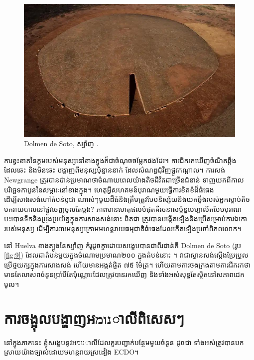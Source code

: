 \documentclass[10pt,twocolumn,letterpaper]{article}
\begin{document}
\begin{figure}[b]
\begin{center}
   \includegraphics[width=1\linewidth]{dolmen.jpg}
\end{center}
   \caption{Dolmen de Soto, ស្ប៉ាញ \cite{53}.}
\label{fig:9}
\label{fig:onecol}
\end{figure}

ការខ្វះខាតនៃក្តមរបស់មនុស្សនៅខាងក្នុងក៏ជាចំណុចចម្លែកផងដែរ។ ការជីករកឃើញចំណិតឆ្អឹងដែលឆេះ និងមិនឆេះ បង្ហាញពីមនុស្សប៉ុន្មាននាក់ ដែលសំណព្វជុំវិញផ្លូវកណ្តាល។ ការសង់ Newgrange ត្រូវបានប៉ាន់ប្រមាណថាចំណាយពេលយ៉ាងតិចជីវិតជាច្រើនជំនាន់ ទាញយកពីកាលបរិច្ឆេទកាបូននៃសម្ភារៈនៅខាងក្នុង។ ហេតុអ្វីសហគមន៍បុរាណមួយធ្វើការខិតខំដ៏ធំធេងដើម្បីសាងសង់ហៅតំបន់បូជា ណាស់ៗមួយដ៏ធំនិងត្រឹមត្រូវបែបនិស្ស័យនិងយកឆ្អឹងរបស់អ្នកស្លាប់តិចមករាយបាលនៅផ្លូវចេញចូលតែម្តង? ភាពមានហេតុផលបំផុតគឺរចនាសម្ព័ន្ធមេហ្គាលីតបែបបុរាណបះបោនទឹកនិងប្រុងប្រយ័ត្នក្នុងការសាងសង់នោះ ពិតជា ត្រូវបានបង្កើតឡើងនិងប្រើសម្រាប់ការឯកោរបស់មនុស្ស ដើម្បីការពារមនុស្សក្រោមមហន្តរាយធម្មជាតិធំធេងដែលកើតឡើងប្រចាំពិភពលោក។

នៅ Huelva ខាងត្បូងនៃស្ប៉ាញ គំរូដូចគ្នាដោយសង្ខេបបានជាពីរជាន់គឺ Dolmen de Soto (រូប \ref{fig:9}) ដែលជាតំបន់មួយក្នុងចំណោមប្រមាណ២០០ ក្នុងតំបន់នោះ \cite{72,32}។ វាជាស្ថានសង់ស្ដើងប្រែប្រួល ប្រើថ្មយក្សក្នុងការសាងសង់ ហើយមានអង្កត់ផ្ចិត ៧៥ ម៉ែត្រ។ ហើយតាមការចងក្រងតាមការជីករកថា មានតែលាសពចំនួនប្រាំបីតែប៉ុណ្ណោះដែលត្រូវបានរកឃើញ និងទាំងអស់សុទ្ធតែស្ថិតនៅសភាពដេកមូល។

\section{ការចង្អុលបង្ហាញអנומាលីពិសេសៗ}

នៅក្នុងភាគនេះ ខ្ញុំសង្ខេបនូវអנומាលីដែលគួរបញ្ជាក់បន្ថែមមួយចំនួន ដូចជា ទាំងអស់ត្រូវបានបកស្រាយយ៉ាងច្បាស់ដោយមហន្តរាយស្រដៀង ECDO។
\end{document}

